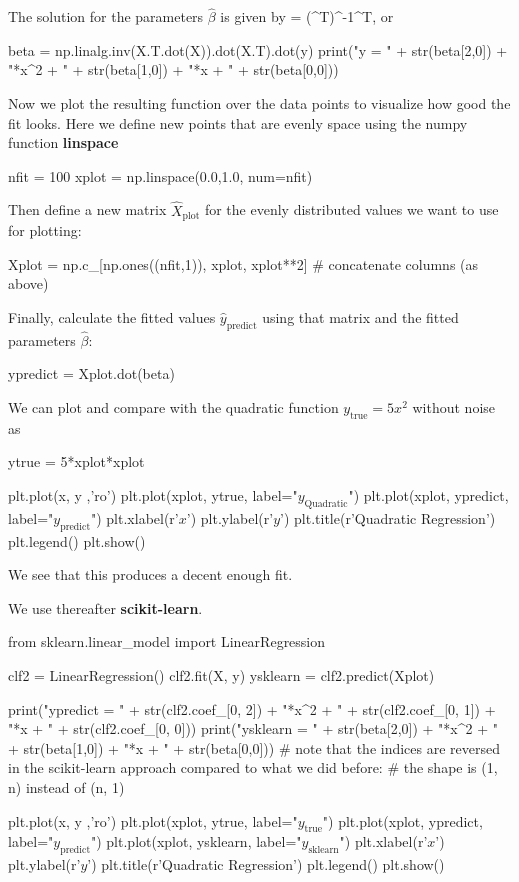 \documentclass[%
oneside,                 %
final,                   %
10pt]{article}
\begin{document}
The solution for the parameters $\hat{\beta}$ is given by
\hat{\beta} = \left(^T\right)^{-1}^T,
or


\bpycod
beta = np.linalg.inv(X.T.dot(X)).dot(X.T).dot(y)
print("y = " + str(beta[2,0]) + "*x^2 + " + str(beta[1,0]) + "*x + " + str(beta[0,0]))
\epycod

Now we plot the resulting function over the data points to visualize
how good the fit looks. Here we define new points that are evenly space using the numpy function \textbf{linspace}

\bpycod
nfit = 100
xplot = np.linspace(0.0,1.0, num=nfit)
\epycod

Then define a new matrix $\hat{X}_{\mathrm{plot}}$ for the evenly
distributed values we want to use for plotting:


\bpycod
Xplot = np.c_[np.ones((nfit,1)), xplot, xplot**2] # concatenate columns (as above)
\epycod

Finally, calculate the fitted values $\hat{y}_{\mathrm{predict}}$
using that matrix and the fitted parameters $\hat{\beta}$:


\bpycod
ypredict = Xplot.dot(beta)
\epycod

We can plot and compare with the quadratic function $y_{\mathrm{true}} = 5x^2$ without noise as

\bpycod
ytrue = 5*xplot*xplot

plt.plot(x, y ,'ro')
plt.plot(xplot, ytrue, label="$y_{\mathrm{Quadratic}}$")
plt.plot(xplot, ypredict, label="$y_{\mathrm{predict}}$")
plt.xlabel(r'$x$')
plt.ylabel(r'$y$')
plt.title(r'Quadratic Regression')
plt.legend()
plt.show()
\epycod

We see that this produces a decent enough fit.

We use thereafter \textbf{scikit-learn}.


\bpycod
from sklearn.linear_model import LinearRegression

clf2 = LinearRegression()
clf2.fit(X, y)
ysklearn = clf2.predict(Xplot)

print("ypredict = " + str(clf2.coef_[0, 2]) + "*x^2 + " + str(clf2.coef_[0, 1]) + "*x + " + str(clf2.coef_[0, 0]))
print("ysklearn = " + str(beta[2,0]) + "*x^2 + " + str(beta[1,0]) + "*x + " + str(beta[0,0]))
# note that the indices are reversed in the scikit-learn approach compared to what we did before:
# the shape is (1, n) instead of (n, 1)

plt.plot(x, y ,'ro')
plt.plot(xplot, ytrue, label="$y_{\mathrm{true}}$")
plt.plot(xplot, ypredict, label="$y_{\mathrm{predict}}$")
plt.plot(xplot, ysklearn, label="$y_{\mathrm{sklearn}}$")
plt.xlabel(r'$x$')
plt.ylabel(r'$y$')
plt.title(r'Quadratic Regression')
plt.legend()
plt.show()
\epycod
\end{document}
